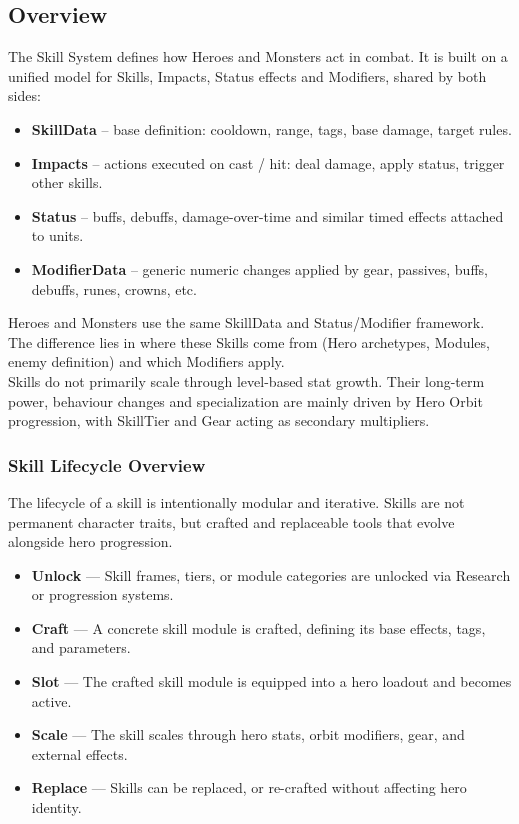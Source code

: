 \subsection{Overview}

The Skill System defines how Heroes and Monsters act in combat. 
It is built on a unified model for Skills, Impacts, Status effects and Modifiers, shared by both sides:

\begin{itemize}
	\item \textbf{SkillData} -- base definition: cooldown, range, tags, base damage, target rules.
	\item \textbf{Impacts} -- actions executed on cast / hit: deal damage, apply status, trigger other skills.
	\item \textbf{Status} -- buffs, debuffs, damage-over-time and similar timed effects attached to units.
	\item \textbf{ModifierData} -- generic numeric changes applied by gear, passives, buffs, debuffs, runes, crowns, etc.
\end{itemize}

Heroes and Monsters use the same SkillData and Status/Modifier framework. 
The difference lies in where these Skills come from (Hero archetypes, Modules, enemy definition) and which Modifiers apply.\\

Skills do not primarily scale through level-based stat growth. Their long-term power, behaviour changes and specialization are mainly driven by Hero Orbit progression, with SkillTier and Gear acting as secondary multipliers.

\subsubsection{Skill Lifecycle Overview}


The lifecycle of a skill is intentionally modular and iterative. Skills are not permanent character traits, but crafted and replaceable tools that evolve alongside hero progression.

\begin{itemize}
	\item \textbf{Unlock} — Skill frames, tiers, or module categories are unlocked via Research or progression systems.
	\item \textbf{Craft} — A concrete skill module is crafted, defining its base effects, tags, and parameters.
	\item \textbf{Slot} — The crafted skill module is equipped into a hero loadout and becomes active.
	\item \textbf{Scale} — The skill scales through hero stats, orbit modifiers, gear, and external effects.
	\item \textbf{Replace} — Skills can be replaced, or re-crafted without affecting hero identity.
\end{itemize}

